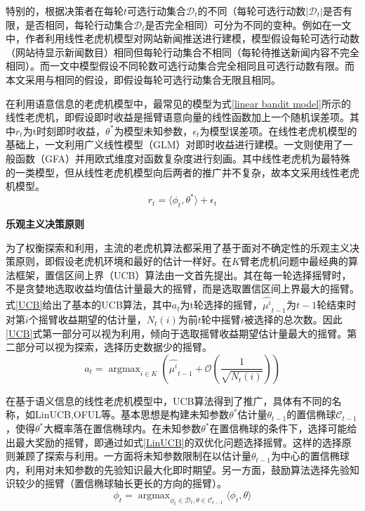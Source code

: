 \documentclass[UTF8,a4paper,10.5pt]{ctexart}
\newcommand{\Ccal}{\mathcal C}
\newcommand{\Dcal}{\mathcal D}
\newcommand{\Ocal}{\mathcal O}
\newcommand{\argmax}{\mathop{\arg\max}}
\begin{document}
特别的，根据决策者在每轮$t$可选行动集合$\Dcal_t$的不同（每轮可选行动数$|\Dcal_t|$是否有限，是否相同，每轮行动集合$\Dcal_t$是否完全相同）可分为不同的变种。例如在\cite{news_recommendation}一文中，作者利用线性老虎机模型对网站新闻推送进行建模，模型假设每轮可选行动数（网站待显示新闻数目）相同但每轮行动集合不相同（每轮待推送新闻内容不完全相同）。而\cite{Xue20}一文中模型假设不同轮数可选行动集合完全相同且可选行动数有限。而本文采用与\cite{nips11}相同的假设，即假设每轮可选行动集合无限且相同。

在利用语意信息的老虎机模型中，最常见的模型为式\ref{linear bandit model}所示的线性老虎机，即假设即时收益是摇臂语意向量的线性函数加上一个随机误差项。其中$r_t$为t时刻即时收益，$\theta^*$为模型未知参数，$\epsilon_t$为模型误差项。在线性老虎机模型的基础上，\cite{GLMpaper}一文利用广义线性模型（GLM）对即时收益进行建模。\cite{GFApaper}一文则使用了一般函数（GFA）并用欧式维度对函数复杂度进行刻画。其中线性老虎机为最特殊的一类模型，但从线性老虎机模型向后两者的推广并不复杂，故本文采用线性老虎机模型。
\begin{equation}
	r_t = \langle \phi_t, \theta^* \rangle + \epsilon_t
	\label{linear bandit model}
\end{equation}

\textbf{乐观主义决策原则}

为了权衡探索和利用，主流的老虎机算法都采用了基于面对不确定性的乐观主义决策原则，即假设老虎机环境和最好的估计一样好\cite{banditbook}。在$K$臂老虎机问题中最经典的算法框架，置信区间上界（UCB）算法由\cite{UCBpaper}一文首先提出。其在每一轮选择摇臂时，不是贪婪地选取收益均值估计量最大的摇臂，而是选取置信区间上界最大的摇臂。式\ref{UCB}给出了基本的UCB算法，其中$a_t$为t轮选择的摇臂，$\widehat{\mu^i}_{t-1}$为$t-1$轮结束时对第$i$个摇臂收益期望的估计量，$N_{t}(i)$为前$t$轮中摇臂$i$被选择的总次数。因此\ref{UCB}式第一部分可以视为利用，倾向于选取摇臂收益期望估计量最大的摇臂。第二部分可以视为探索，选择历史数据少的摇臂。
\begin{equation}
	a_t= \argmax_{i \in K}\left(\widehat{\mu^i}_{t-1} + \Ocal(\frac{1}{\sqrt{N_t(i)}})\right)
	\label{UCB}
\end{equation}

在基于语义信息的线性老虎机模型中，UCB算法得到了推广，具体有不同的名称，如LinUCB,OFUL等。基本思想是构建未知参数$\theta^*$估计量$\theta_{t-1}$的置信椭球$\Ccal_{t-1}$，使得$\theta^*$大概率落在置信椭球内。在未知参数$\theta^*$在置信椭球的条件下，选择可能给出最大奖励的摇臂，即通过如式\ref{LinUCB}的双优化问题选择摇臂。这样的选择原则兼顾了探索与利用。一方面将未知参数限制在以估计量$\theta_{t-1}$为中心的置信椭球内，利用对未知参数的先验知识最大化即时期望。另一方面，鼓励算法选择先验知识较少的摇臂（置信椭球轴长更长的方向的摇臂）。
\begin{equation}
	\phi_t = \argmax_{\phi_t\in \Dcal_t ,\theta\in \Ccal_{t-1}}\langle\phi_t, \theta \rangle
	\label{LinUCB}
\end{equation}
\end{document}
